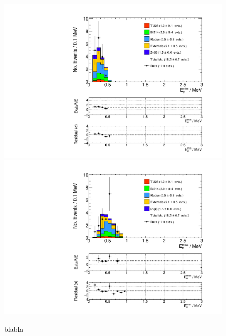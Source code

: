 \documentclass[main.tex]{subfiles}
\begin{document}
\begin{figure} [h!]
\begin{center}
\includegraphics[scale=0.5]{pictures/FinalResults/bb2nu2/150/Eemin_bb2nu2NS.pdf}
\includegraphics[scale=0.5]{pictures/FinalResults/bb2nu2/150/Eemax_bb2nu2NS.pdf}
\end{center}
\caption{blabla}
\label{plot:EeminAndEemax250bb2nu2_150}
\end{figure}
\end{document}
